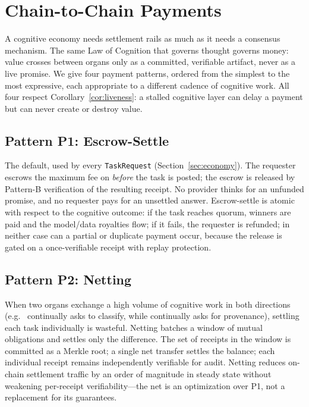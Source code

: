 \section{Chain-to-Chain Payments}
\label{sec:payments}

A cognitive economy needs settlement rails as much as it needs a consensus mechanism. The same Law of Cognition that governs thought governs money: value crosses between organs only as a committed, verifiable artifact, never as a live promise. We give four payment patterns, ordered from the simplest to the most expressive, each appropriate to a different cadence of cognitive work. All four respect Corollary~\ref{cor:liveness}: a stalled cognitive layer can delay a payment but can never create or destroy value.

\subsection{Pattern P1: Escrow-Settle}

The default, used by every \texttt{TaskRequest} (Section~\ref{sec:economy}). The requester escrows the maximum fee on \CChain{} \emph{before} the task is posted; the escrow is released by Pattern-B verification of the resulting \PoT{} receipt. No provider thinks for an unfunded promise, and no requester pays for an unsettled answer. Escrow-settle is atomic with respect to the cognitive outcome: if the task reaches quorum, winners are paid and the model/data royalties flow; if it fails, the requester is refunded; in neither case can a partial or duplicate payment occur, because the release is gated on a once-verifiable receipt with replay protection.

\subsection{Pattern P2: Netting}

When two organs exchange a high volume of cognitive work in both directions (e.g.\ \CChain{} continually asks \AChain{} to classify, while \AChain{} continually asks \DChain{} for provenance), settling each task individually is wasteful. Netting batches a window of mutual obligations and settles only the difference. The set of receipts in the window is committed as a Merkle root; a single net transfer settles the balance; each individual receipt remains independently verifiable for audit. Netting reduces on-chain settlement traffic by an order of magnitude in steady state without weakening per-receipt verifiability---the net is an optimization over P1, not a replacement for its guarantees.

